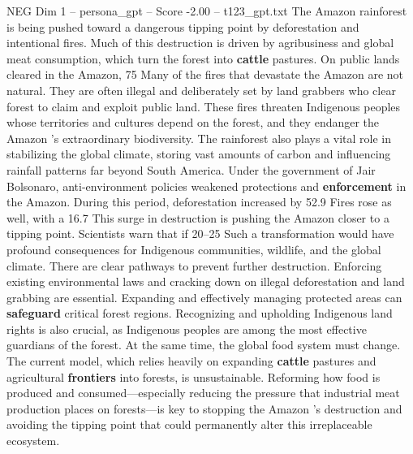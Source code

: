 \begin{textsample}{NEG Dim 1 – persona\_gpt – Score -2.00 – t123\_gpt.txt}  \label{ex:f1_neg_031}
The Amazon rainforest is being pushed toward a dangerous tipping point by deforestation and intentional fires.
Much of this destruction is driven by agribusiness and global meat consumption, which turn the forest into \textbf{cattle} pastures.
On public lands cleared in the Amazon, 75 %
Many of the fires that devastate the Amazon are not natural.
They are often illegal and deliberately set by land grabbers who clear forest to claim and exploit public land.
These fires threaten Indigenous peoples whose territories and cultures depend on the forest, and they endanger the Amazon ’s extraordinary biodiversity.
The rainforest also plays a vital role in stabilizing the global climate, storing vast amounts of carbon and influencing rainfall patterns far beyond South America.
Under the government of Jair Bolsonaro, anti-environment policies weakened protections and \textbf{enforcement} in the Amazon.
During this period, deforestation increased by 52.9 %
Fires rose as well, with a 16.7 %
This surge in destruction is pushing the Amazon closer to a tipping point.
Scientists warn that if 20–25 %
Such a transformation would have profound consequences for Indigenous communities, wildlife, and the global climate.
There are clear pathways to prevent further destruction.
Enforcing existing environmental laws and cracking down on illegal deforestation and land grabbing are essential.
Expanding and effectively managing protected areas can \textbf{safeguard} critical forest regions.
Recognizing and upholding Indigenous land rights is also crucial, as Indigenous peoples are among the most effective guardians of the forest.
At the same time, the global food system must change.
The current model, which relies heavily on expanding \textbf{cattle} pastures and agricultural \textbf{frontiers} into forests, is unsustainable.
Reforming how food is produced and consumed—especially reducing the pressure that industrial meat production places on forests—is key to stopping the Amazon ’s destruction and avoiding the tipping point that could permanently alter this irreplaceable ecosystem.

\end{textsample}
